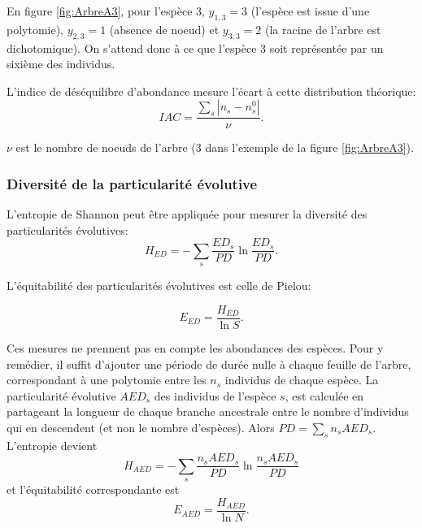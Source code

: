 \documentclass[
  11pt,
  french,
  a4paper,
  extrafontsizes,onecolumn,openright
  ]{memoir}
\begin{document}
En figure \ref{fig:ArbreA3}, pour l'espèce 3, \(y_{1,3}=3\) (l'espèce est issue d'une polytomie), \(y_{2,3}=1\) (absence de noeud) et \(y_{3,3}=2\) (la racine de l'arbre est dichotomique).
On s'attend donc à ce que l'espèce 3 soit représentée par un sixième des individus.

L'indice de déséquilibre d'abondance mesure l'écart à cette distribution théorique:
\begin{equation}
  \label{eq:IAC}
  \mathit{IAC} = \frac{\sum_s{|n_s - n_s^0|}}{\nu}.
\end{equation}

\(\nu\) est le nombre de noeuds de l'arbre (3 dans l'exemple de la figure \ref{fig:ArbreA3}).

\hypertarget{diversituxe9-de-la-particularituxe9-uxe9volutive}{%
\subsubsection{Diversité de la particularité évolutive}\label{diversituxe9-de-la-particularituxe9-uxe9volutive}}

L'entropie de Shannon peut être appliquée pour mesurer la diversité des particularités évolutives:
\begin{equation}
  \label{eq:HED}
  H_{\mathit{ED}} = -\sum_s{\frac{\mathit{ED}_s}{\mathit{PD}} \ln\frac{\mathit{ED}_s}{\mathit{PD}}}.
\end{equation}

L'équitabilité des particularités évolutives est celle de Pielou:

\begin{equation}
  \label{eq:EED}
  E_{\mathit{ED}} = \frac{H_{\mathit{ED}}}{\ln{S}}.
\end{equation}

Ces mesures ne prennent pas en compte les abondances des espèces.
Pour y remédier, il suffit d'ajouter une période de durée nulle à chaque feuille de l'arbre, correspondant à une polytomie entre les \(n_s\) individus de chaque espèce.
La particularité évolutive \(\mathit{AED}_s\) des individus de l'espèce \(s\), est calculée en partageant la longueur de chaque branche ancestrale entre le nombre d'individus qui en descendent (et non le nombre d'espèces).
Alors \(\mathit{PD} = \sum_s{n_s \mathit{AED}_s}\).
L'entropie devient
\begin{equation}
  \label{eq:HAED}
  H_{\mathit{AED}} = -\sum_s{\frac{n_s \mathit{AED}_s}{\mathit{PD}} \ln\frac{n_s \mathit{AED}_s}{\mathit{PD}}}
\end{equation}
et l'équitabilité correspondante est
\begin{equation}
  \label{eq:EAED}
  E_{\mathit{AED}} = \frac{H_{\mathit{AED}}}{\ln{N}}.
\end{equation}
\end{document}
